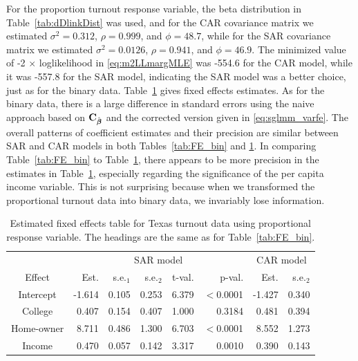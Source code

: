 \documentclass[12pt, titlepage]{article}
\begin{document}
For the proportion turnout response variable, the beta distribution in Table~\ref{tab:dDlinkDist} was used, and for the CAR covariance matrix we estimated $\sigma^{2} = 0.312$, $\rho = 0.999$, and $\phi = 48.7$, while for the SAR covariance matrix we estimated $\sigma^{2} = 0.0126$, $\rho = 0.941$, and $\phi = 46.9$.  The minimized value of -2 $\times$ loglikelihood in \eqref{eq:m2LLmargMLE} was -554.6 for the CAR model, while it was -557.8 for the SAR model, indicating the SAR model was a better choice, just as for the binary data. Table~\ref{tab:FE_turnout} gives fixed effects estimates.  As for the binary data, there is a large difference in standard errors using the naive approach based on $\mathbf{C}_{{\hat{\boldsymbol{\beta}}}}$ and the corrected version given in \eqref{eq:sglmm_varfe}.  The overall patterns of coefficient estimates and their precision are similar between SAR and CAR models in both Tables~\ref{tab:FE_bin} and \ref{tab:FE_turnout}.  In comparing Table~\ref{tab:FE_bin} to Table~\ref{tab:FE_turnout}, there appears to be more precision in the estimates in Table~\ref{tab:FE_turnout}, especially regarding the significance of the per capita income variable.  This is not surprising because when we transformed the proportional turnout data into binary data, we invariably lose information.

\begin{table}[H] 
	\caption{Estimated fixed effects table for Texas turnout data using proportional response variable.  The headings are the same as for Table~\ref{tab:FE_bin}.  \label{tab:FE_turnout}}
\begin{center}
\begin{tabular}{|c|rrrrr|rr|}
\hline
\hline{}
{} & \multicolumn{5}{c|}{SAR model} & \multicolumn{2}{c|}{CAR model} \\
Effect & Est. & s.e.$_{1}$ & s.e.$_{2}$ & t-val. & p-val. & Est. & s.e.$_{2}$ \\
\hline{}
Intercept & -1.614 & 0.105 & 0.253 & 6.379 & $<$0.0001 & -1.427 & 0.340\\ 
College & 0.407 & 0.154 & 0.407 & 1.000 & 0.3184 & 0.481 & 0.394\\ 
Home-owner & 8.711 & 0.486 & 1.300 & 6.703 & $<$0.0001 & 8.552 & 1.273\\ 
Income &  0.470 & 0.057 & 0.142 & 3.317 & 0.0010 & 0.390 & 0.143\\ 
\hline
\hline
\end{tabular}
\end{center}
\end{table}
\end{document}
